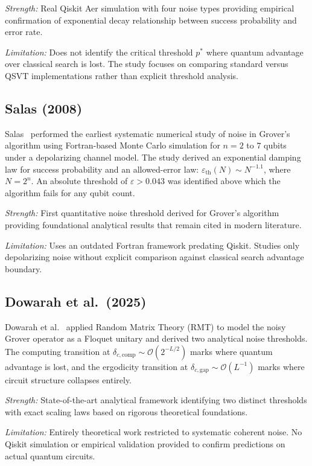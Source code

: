\documentclass[conference]{IEEEtran}
\begin{document}
\textit{Strength:} Real Qiskit Aer simulation with four noise types providing
empirical confirmation of exponential decay relationship between success
probability and error rate.

\textit{Limitation:} Does not identify the critical threshold $p^{*}$ where
quantum advantage over classical search is lost. The study focuses on comparing
standard versus QSVT implementations rather than explicit threshold analysis.

\subsection{Salas (2008)}

Salas~\cite{salas2008} performed the earliest systematic numerical study of noise
in Grover's algorithm using Fortran-based Monte Carlo simulation for $n = 2$ to
$7$ qubits under a depolarizing channel model. The study derived an exponential
damping law for success probability and an allowed-error law:
$\varepsilon_{\text{th}}(N) \sim N^{-1.1}$, where $N = 2^{n}$. An absolute
threshold of $\varepsilon > 0.043$ was identified above which the algorithm fails
for any qubit count.

\textit{Strength:} First quantitative noise threshold derived for Grover's
algorithm providing foundational analytical results that remain cited in modern
literature.

\textit{Limitation:} Uses an outdated Fortran framework predating Qiskit. Studies
only depolarizing noise without explicit comparison against classical search
advantage boundary.

\subsection{Dowarah et al.\ (2025)}

Dowarah et al.~\cite{dowarah2025} applied Random Matrix Theory (RMT) to model the
noisy Grover operator as a Floquet unitary and derived two analytical noise
thresholds. The computing transition at $\delta_{c,\text{comp}} \sim
\mathcal{O}(2^{-L/2})$ marks where quantum advantage is lost, and the ergodicity
transition at $\delta_{c,\text{gap}} \sim \mathcal{O}(L^{-1})$ marks where circuit
structure collapses entirely.

\textit{Strength:} State-of-the-art analytical framework identifying two distinct
thresholds with exact scaling laws based on rigorous theoretical foundations.

\textit{Limitation:} Entirely theoretical work restricted to systematic coherent
noise. No Qiskit simulation or empirical validation provided to confirm predictions
on actual quantum circuits.
\end{document}
